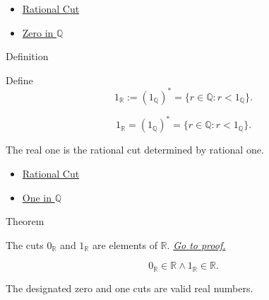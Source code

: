 \begin{dependencies}
\begin{itemize}
  \item \hyperref[def:rational-cut]{Rational Cut}
  \item \hyperref[def:zero-in-q]{Zero in $\mathbb{Q}$}
\end{itemize}
\end{dependencies}

\begin{definitionbox}{Definition}
\begin{definition}
\label{def:one-in-r}
Define
\[
1_{\mathbb{R}}:=(1_{\mathbb{Q}})^{\ast}
=\{r\in\mathbb{Q}:r<1_{\mathbb{Q}}\}.
\]
\end{definition}
\end{definitionbox}

\begin{remark*}
\[
1_{\mathbb{R}}=(1_{\mathbb{Q}})^{\ast}
=\{r\in\mathbb{Q}:r<1_{\mathbb{Q}}\}.
\]
\end{remark*}

\begin{remark*}[Interpretation]
The real one is the rational cut determined by rational one.
\end{remark*}

\begin{dependencies}
\begin{itemize}
  \item \hyperref[def:rational-cut]{Rational Cut}
  \item \hyperref[def:one-in-q]{One in $\mathbb{Q}$}
\end{itemize}
\end{dependencies}

\begin{theorembox}{Theorem}
\begin{theorem}
\label{thm:zero-one-are-reals}
The cuts $0_{\mathbb{R}}$ and $1_{\mathbb{R}}$ are elements of $\mathbb{R}$.
\hyperref[prf:zero-one-are-reals]{\textit{Go to proof.}}
\end{theorem}
\end{theorembox}

\begin{remark*}
\[
0_{\mathbb{R}}\in\mathbb{R}\land 1_{\mathbb{R}}\in\mathbb{R}.
\]
\end{remark*}

\begin{remark*}[Interpretation]
The designated zero and one cuts are valid real numbers.
\end{remark*}

